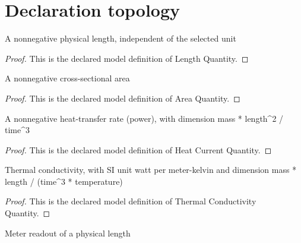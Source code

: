 \section{Declaration topology}
\begin{definition}
  \label{def:physics:phyx-mini-0331:phyxminiproblems-problemphyxmini0331-lengthquantity}
  A nonnegative physical length, independent of the selected unit
\end{definition}
\begin{proof}
  This is the declared model definition of Length Quantity.
\end{proof}
\begin{definition}
  \label{def:physics:phyx-mini-0331:phyxminiproblems-problemphyxmini0331-areaquantity}
  A nonnegative cross-sectional area
\end{definition}
\begin{proof}
  This is the declared model definition of Area Quantity.
\end{proof}
\begin{definition}
  \label{def:physics:phyx-mini-0331:phyxminiproblems-problemphyxmini0331-heatcurrentquantity}
  A nonnegative heat-transfer rate (power), with dimension mass * length\textasciicircum{}2 / time\textasciicircum{}3
\end{definition}
\begin{proof}
  This is the declared model definition of Heat Current Quantity.
\end{proof}
\begin{definition}
  \label{def:physics:phyx-mini-0331:phyxminiproblems-problemphyxmini0331-thermalconductivityquantity}
  Thermal conductivity, with SI unit watt per meter-kelvin and dimension mass * length / (time\textasciicircum{}3 * temperature)
\end{definition}
\begin{proof}
  This is the declared model definition of Thermal Conductivity Quantity.
\end{proof}
\begin{definition}
  \label{def:physics:phyx-mini-0331:phyxminiproblems-problemphyxmini0331-lengthinmeters}
  Meter readout of a physical length
\end{definition}

